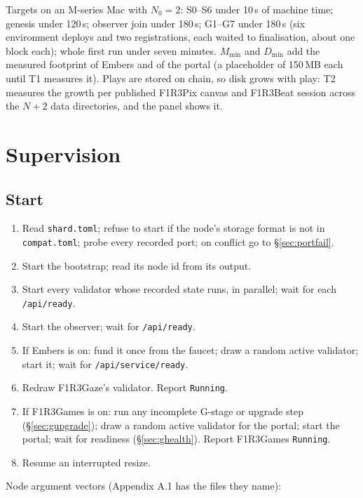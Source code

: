 \documentclass[11pt]{article}
\theoremstyle{definition}
\theoremstyle{remark}
\newcommand{\code}[1]{\texttt{#1}}
\newcommand{\Gz}{F1R3Gaze}
\newcommand{\Gm}{F1R3Games}
\newcommand{\Em}{Embers}
\begin{document}
Targets on an M-series Mac with $N_0 = 2$: S0--S6 under 10\,s of machine time; genesis
under 120\,s; observer join under 180\,s; G1--G7 under 180\,s (six environment
deploys and two registrations, each waited to finalisation, about one block each);
whole first run under seven minutes. $M_{\min}$ and $D_{\min}$ add the measured
footprint of \Em{} and of the portal (a placeholder of 150\,MB each until T1 measures
it). Plays are stored on chain, so disk grows with play: T2 measures the growth per
published F1R3Pix canvas and F1R3Beat session across the $N+2$ data directories, and
the panel shows it.

\section{Supervision}\label{sec:supervise}

\subsection{Start}\label{sec:start}
\begin{enumerate}[nosep]
\item Read \code{shard.toml}; refuse to start if the node's storage format is not in
  \code{compat.toml}; probe every recorded port; on conflict go to
  \S\ref{sec:portfail}.
\item Start the bootstrap; read its node id from its output.
\item Start every validator whose recorded state runs, in parallel; wait for each
  \code{/api/ready}.
\item Start the observer; wait for \code{/api/ready}.
\item If \Em{} is on: fund it once from the faucet; draw a random active validator;
  start it; wait for \code{/api/service/ready}.
\item Redraw \Gz{}'s validator. Report \code{Running}.
\item If \Gm{} is on: run any incomplete G-stage or upgrade step
  (\S\ref{sec:gupgrade}); draw a random active validator for the portal; start the
  portal; wait for readiness (\S\ref{sec:ghealth}). Report \Gm{} \code{Running}.
\item Resume an interrupted resize.
\end{enumerate}

\noindent
Node argument vectors (Appendix A.1 has the files they name):
\end{document}
